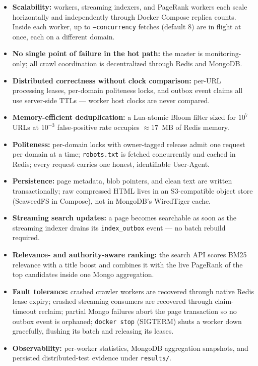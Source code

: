\documentclass[11pt,a4paper]{article}
\newcommand{\code}[1]{\texttt{#1}}
\begin{document}
\begin{itemize}
  \item \textbf{Scalability:} workers, streaming indexers, and PageRank workers each scale horizontally and independently through Docker Compose replica counts. Inside each worker, up to \code{--concurrency} fetches (default 8) are in flight at once, each on a different domain.
  \item \textbf{No single point of failure in the hot path:} the master is monitoring-only; all crawl coordination is decentralized through Redis and MongoDB.
  \item \textbf{Distributed correctness without clock comparison:} per-URL processing leases, per-domain politeness locks, and outbox event claims all use server-side TTLs --- worker host clocks are never compared.
  \item \textbf{Memory-efficient deduplication:} a Lua-atomic Bloom filter sized for $10^7$ URLs at $10^{-3}$ false-positive rate occupies $\approx 17$~MB of Redis memory.
  \item \textbf{Politeness:} per-domain locks with owner-tagged release admit one request per domain at a time; \code{robots.txt} is fetched concurrently and cached in Redis; every request carries one honest, identifiable User-Agent.
  \item \textbf{Persistence:} page metadata, blob pointers, and clean text are written transactionally; raw compressed HTML lives in an S3-compatible object store (SeaweedFS in Compose), not in MongoDB's WiredTiger cache.
  \item \textbf{Streaming search updates:} a page becomes searchable as soon as the streaming indexer drains its \code{index\_outbox} event --- no batch rebuild required.
  \item \textbf{Relevance- and authority-aware ranking:} the search API scores BM25 relevance with a title boost and combines it with the live PageRank of the top candidates inside one Mongo aggregation.
  \item \textbf{Fault tolerance:} crashed crawler workers are recovered through native Redis lease expiry; crashed streaming consumers are recovered through claim-timeout reclaim; partial Mongo failures abort the page transaction so no outbox event is orphaned; \code{docker stop} (SIGTERM) shuts a worker down gracefully, flushing its batch and releasing its leases.
  \item \textbf{Observability:} per-worker statistics, MongoDB aggregation snapshots, and persisted distributed-test evidence under \code{results/}.
\end{itemize}
\end{document}
